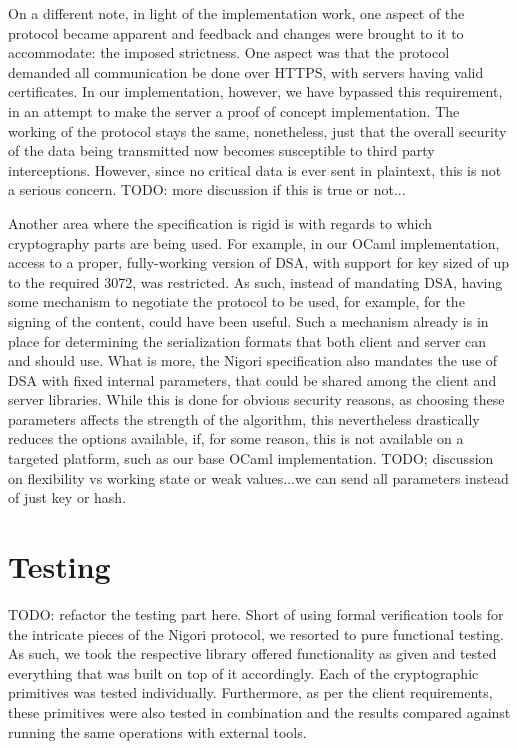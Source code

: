 On a different note, in light of the implementation work, one aspect of the protocol became apparent and feedback and changes were brought to it to accommodate: the imposed strictness.
One aspect was that the protocol demanded all communication be done over HTTPS, with servers having valid certificates.
In our implementation, however, we have bypassed this requirement, in an attempt to make the server a proof of concept implementation.
The working of the protocol stays the same, nonetheless, just that the overall security of the data being transmitted now becomes susceptible to third party interceptions.
However, since no critical data is ever sent in plaintext, this is not a serious concern.
TODO: more discussion if this is true or not...

Another area where the specification is rigid is with regards to which cryptography parts are being used.
For example, in our OCaml implementation, access to a proper, fully-working version of DSA, with support for key sized of up to the required 3072, was restricted.
As such, instead of mandating DSA, having some mechanism to negotiate the protocol to be used, for example, for the signing of the content, could have been useful.
Such a mechanism already is in place for determining the serialization formats that both client and server can and should use.
What is more, the Nigori specification also mandates the use of DSA with fixed internal parameters, that could be shared among the client and server libraries.
While this is done for obvious security reasons, as choosing these parameters affects the strength of the algorithm, this nevertheless drastically reduces the options available, if, for some reason, this is not available on a targeted platform, such as our base OCaml implementation.
TODO; discussion on flexibility vs working state or weak values...we can send all parameters instead of just key or hash.

\section{Testing}
TODO: refactor the testing part here.
Short of using formal verification tools for the intricate pieces of the Nigori protocol, we resorted to pure functional testing.
As such, we took the respective library offered functionality as given and tested everything that was built on top of it accordingly.
Each of the cryptographic primitives was tested individually.
Furthermore, as per the client requirements, these primitives were also tested in combination and the results compared against running the same operations with external tools.

